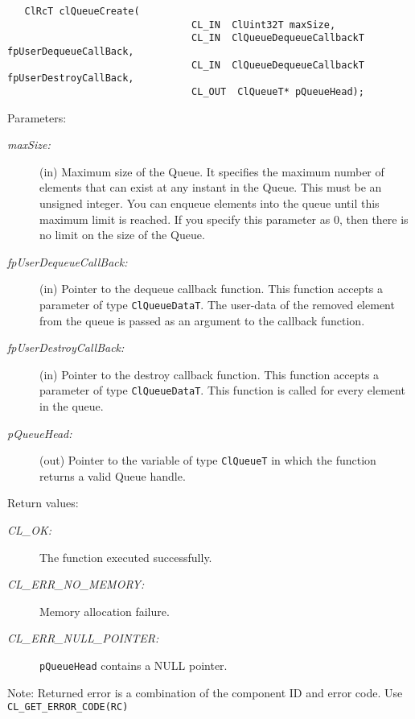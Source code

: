 \begin{flushleft}
\begin{Desc}
\footnotesize\begin{verbatim}   ClRcT clQueueCreate(
                           		CL_IN  ClUint32T maxSize,
                           		CL_IN  ClQueueDequeueCallbackT fpUserDequeueCallBack,
                           		CL_IN  ClQueueDequeueCallbackT fpUserDestroyCallBack,
                           		CL_OUT  ClQueueT* pQueueHead);
\end{verbatim}
\normalsize
\end{Desc}
\begin{Desc}
\item[Parameters:]
\begin{description}
\item[{\em max\-Size:}](in) Maximum size of the Queue. It specifies the maximum number of elements that can exist at any instant in the Queue. 
This must be an unsigned integer. You can enqueue elements into the queue until this maximum limit is reached. If you specify this parameter as 0, then 
there is no limit on the size of the Queue.
\item[{\em fp\-User\-Dequeue\-Call\-Back:}](in) Pointer to the dequeue callback function. This function
accepts a parameter of type {\tt{Cl\-Queue\-Data\-T}}. The user-data of the removed element from the queue is passed as an argument to the callback 
function. 
\item[{\em fp\-User\-Destroy\-Call\-Back:}](in) Pointer to the destroy callback function. This function accepts a parameter of type 
{\tt{Cl\-Queue\-Data\-T}}. This function is called for every element in the queue.
\item[{\em p\-Queue\-Head:}](out) Pointer to the variable of type {\tt{Cl\-Queue\-T}} in which the function returns a valid Queue handle.\end{description}
\end{Desc}
\begin{Desc}
\item[Return values:]
\begin{description}
\item[{\em CL\_\-OK:}]The function executed successfully. \item[{\em CL\_\-ERR\_\-NO\_\-MEMORY:}]Memory allocation failure. 
\item[{\em CL\_\-ERR\_\-NULL\_\-POINTER:}]{\tt{pQueueHead}} contains a NULL pointer.\end{description}
\end{Desc}
\begin{Desc}
\item[Note:]Returned error is a combination of the component ID and error code. Use {\tt{CL\_\-GET\_\-ERROR\_\-CODE(RC)}}

\end{Desc}
\end{flushleft}

